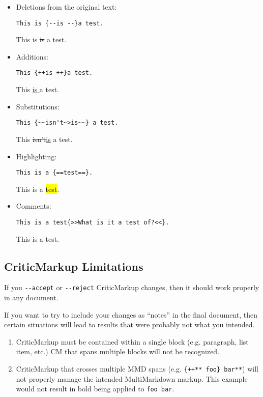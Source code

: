 \begin{itemize}
\item Deletions from the original text:

\begin{verbatim}
This is {--is --}a test.
\end{verbatim}

This is \sout{is }a test.

\item Additions:

\begin{verbatim}
This {++is ++}a test.
\end{verbatim}

This \underline{is }a test.

\item Substitutions:

\begin{verbatim}
This {~~isn't~>is~~} a test.
\end{verbatim}

This \sout{isn't}\underline{is} a test.

\item Highlighting:

\begin{verbatim}
This is a {==test==}.
\end{verbatim}

This is a \hl{test}.

\item Comments:

\begin{verbatim}
This is a test{>>What is it a test of?<<}.
\end{verbatim}

This is a test.

\end{itemize}

\subsection{CriticMarkup Limitations}
\label{criticmarkuplimitations}

If you \texttt{-{}-accept} or \texttt{-{}-reject} CriticMarkup changes, then it should work properly in any document.

If you want to try to include your changes as ``notes'' in the final document, then certain situations will lead to results that were probably not what you intended.

\begin{enumerate}
\item CriticMarkup must be contained within a single block (e.g. paragraph, list item, etc.) CM that spans multiple blocks will not be recognized.

\item CriticMarkup that crosses multiple \gls{MMD} spans (e.g. \texttt{\{++** foo\} bar**}) will not properly manage the intended MultiMarkdown markup. This example would not result in bold being applied to \texttt{foo bar}.

\end{enumerate}

